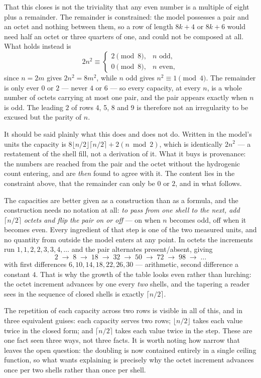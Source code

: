 \documentclass[11pt]{article}
\begin{document}
That this closes is not the triviality that any even number is a multiple of eight plus a
remainder. The remainder is constrained: the model possesses a pair and an octet and nothing
between them, so a row of length $8k+4$ or $8k+6$ would need half an octet or three quarters of
one, and could not be composed at all. What holds instead is
\[
2n^2 \equiv \begin{cases} 2 \pmod 8, & n \text{ odd},\\ 0 \pmod 8, & n \text{ even},\end{cases}
\]
since $n=2m$ gives $2n^2=8m^2$, while $n$ odd gives $n^2\equiv1\pmod 4$. The remainder is only
ever $0$ or $2$ --- never $4$ or $6$ --- so every capacity, at every $n$, is a whole number of
octets carrying at most one pair, and the pair appears exactly when $n$ is odd. The leading $2$
of rows 4, 5, 8 and 9 is therefore not an irregularity to be excused but the parity of $n$.

It should be said plainly what this does and does not do. Written in the model's units the
capacity is $8\lfloor n/2\rfloor\lceil n/2\rceil + 2(n\bmod 2)$, which is identically $2n^2$ --- a
restatement of the shell fill, not a derivation of it. What it buys is provenance: the numbers are
reached from the pair and the octet without the hydrogenic count entering, and are \emph{then}
found to agree with it. The content lies in the constraint above, that the remainder can only be
$0$ or $2$, and in what follows.

The capacities are better given as a construction than as a formula, and the construction needs
no notation at all: \emph{to pass from one shell to the next, add $\lceil n/2\rceil$ octets and
flip the pair on or off} --- on when $n$ becomes odd, off when it becomes even. Every ingredient of
that step is one of the two measured units, and no quantity from outside the model enters at any
point. In octets the
increments run $1,1,2,2,3,3,4,\dots$ and the pair alternates present/absent, giving
\[
2 \;\to\; 8 \;\to\; 18 \;\to\; 32 \;\to\; 50 \;\to\; 72 \;\to\; 98 \;\to\; \dots
\]
with first differences $6,10,14,18,22,26,30$ --- arithmetic, second difference a constant $4$.
That is why the growth of the table looks even rather than lurching: the octet increment advances
by one every \emph{two} shells, and the tapering a reader sees in the sequence of closed shells is
exactly $\lceil n/2 \rceil$.

The repetition of each capacity across two rows is visible in all of this, and in three equivalent
guises: each capacity serves two rows; $\lfloor n/2\rfloor$ takes each value twice in the closed
form; and $\lceil n/2\rceil$ takes each value twice in the step. These are one fact seen three
ways, not three facts. It is worth noting how narrow that leaves the open
question: the doubling is now contained entirely in a single ceiling function, so what wants
explaining is precisely why the octet increment advances once per two shells rather than once per
shell.
\end{document}
